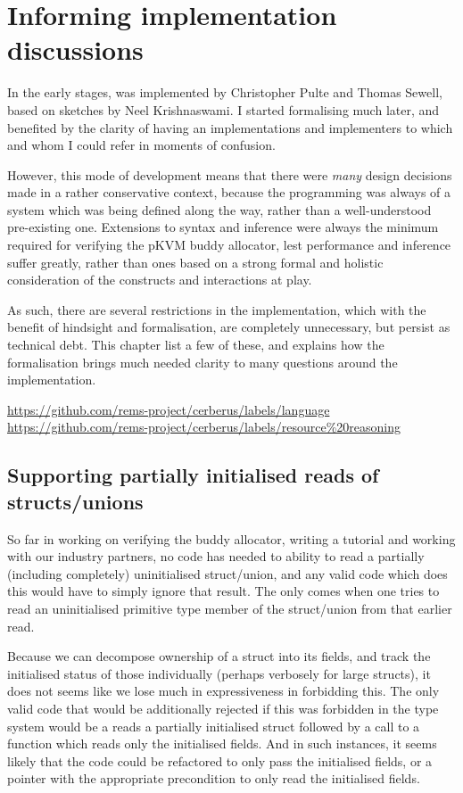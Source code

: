 \chapter{Informing implementation discussions}\label{chap:inform-impl}

In the early stages,  was implemented by Christopher Pulte and Thomas
Sewell, based on sketches by Neel Krishnaswami. I started formalising
 much later, and benefited by the clarity of having an
implementations and implementers to which and whom I could refer in moments of
confusion.

However, this mode of development means that there were \emph{many} design
decisions made in a rather conservative context, because the programming was
always of a system which was being defined along the way, rather than a
well-understood pre-existing one. Extensions to syntax and inference were
always the minimum required for verifying the pKVM buddy allocator, lest
performance and inference suffer greatly, rather than ones based on a strong
formal and holistic consideration of the constructs and interactions at play.

As such, there are several restrictions in the implementation, which with the
benefit of hindsight and formalisation, are completely unnecessary, but persist
as technical debt. This chapter list a few of these, and explains how the
formalisation brings much needed clarity to many questions around the
implementation.

\url{https://github.com/rems-project/cerberus/labels/language}
\url{https://github.com/rems-project/cerberus/labels/resource\%20reasoning}

\section{Supporting partially initialised reads of structs/unions}\label{sec:partial-init-structs}

So far in working on verifying the buddy allocator, writing a tutorial and
working with our industry partners, no code has needed to ability to read a
partially (including completely) uninitialised struct/union, and any valid code
which does this would have to simply ignore that result. The  only comes
when one tries to read an uninitialised primitive type member of the
struct/union from that earlier read.

Because we can decompose ownership of a struct into its fields, and track the
initialised status of those individually (perhaps verbosely for large structs),
it does not seems like we lose much in expressiveness in forbidding this. The
only valid code that would be additionally rejected if this was forbidden in
the type system would be a reads a partially initialised struct followed by a
call to a function which reads only the initialised fields. And in such
instances, it seems likely that the code could be refactored to only pass the
initialised fields, or a pointer with the appropriate precondition to only read
the initialised fields.

